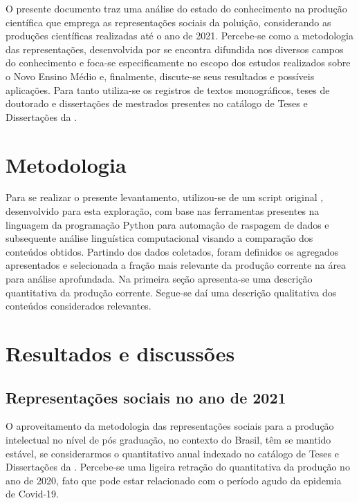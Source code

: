 \documentclass[
   article,       %
   11pt,          %
   oneside,       %
   a4paper,       %
   english,       %
   brazil,           %
   sumario=tradicional
   ]{abntex2}
\begin{document}
O presente documento traz uma análise do estado do conhecimento na produção científica que emprega as representações sociais da poluição, considerando as produções científicas realizadas até o ano de 2021. Percebe-se como a metodologia das representações, desenvolvida por  se encontra difundida nos  diversos campos do conhecimento e foca-se especificamente no escopo dos estudos realizados sobre o Novo Ensino Médio e, finalmente, discute-se seus resultados e possíveis aplicações. Para tanto utiliza-se os registros de textos monográficos, teses de doutorado e dissertações de mestrados presentes no catálogo de Teses e Dissertações da . 

\section{Metodologia}

Para se realizar o presente levantamento, utilizou-se de um script original \cite{Python_NLTK_capes}, desenvolvido para esta exploração, com base nas ferramentas presentes na linguagem da programação Python para automação de raspagem de dados \cite{python_selenium} e subsequente análise linguística computacional \cite{Python_NLTK} visando a comparação dos conteúdos obtidos. Partindo dos dados coletados, foram definidos os agregados apresentados e selecionada a fração mais relevante da produção corrente na área para análise aprofundada. Na primeira seção apresenta-se uma descrição quantitativa da produção corrente. Segue-se daí uma descrição qualitativa dos conteúdos considerados relevantes.


\section{Resultados e discussões}

\subsection{Representações sociais no ano de 2021}

O aproveitamento da metodologia das representações sociais para a produção intelectual no nível de pós graduação, no contexto do Brasil, têm se mantido estável, se considerarmos o quantitativo anual indexado no catálogo de Teses e Dissertações da . Percebe-se uma ligeira retração do quantitativa da produção no ano de 2020, fato que pode estar relacionado com o período agudo da epidemia de Covid-19.
\end{document}
